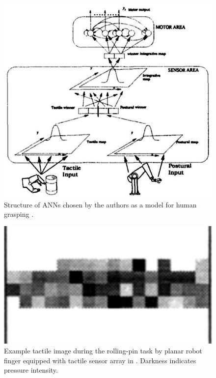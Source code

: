 \begin{figure}[hbt]
	\centering
	\includegraphics[width=\linewidth]{images/sensor_processing}
	\caption{Structure of ANNs chosen by the authors as a model for human grasping \cite{leoni1998implementing}.}
	\label{fig:sensor_processing}
\end{figure}

\begin{figure}[hbt]
	\centering
	\includegraphics[width=\linewidth]{images/tactile_input}
	\caption{Example tactile image during the rolling-pin task by planar robot finger equipped with tactile sensor array in \cite{sikka1994tactile}.
Darkness indicates pressure intensity.}
	\label{fig:tactile_input}
\end{figure}

